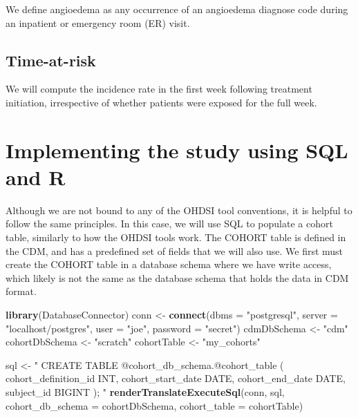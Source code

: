 \documentclass[11pt]{book}
\newenvironment{Shaded}{\begin{snugshade}}{\end{snugshade}}
\newcommand{\DataTypeTok}[1]{\textcolor[rgb]{0.13,0.29,0.53}{#1}}
\newcommand{\KeywordTok}[1]{\textcolor[rgb]{0.13,0.29,0.53}{\textbf{#1}}}
\newcommand{\NormalTok}[1]{#1}
\newcommand{\StringTok}[1]{\textcolor[rgb]{0.31,0.60,0.02}{#1}}
\theoremstyle{definition}
\theoremstyle{definition}
\theoremstyle{definition}
\theoremstyle{remark}
\begin{document}
We define angioedema as any occurrence of an angioedema diagnose code during an inpatient or emergency room (ER) visit.

\hypertarget{time-at-risk}{%
\subsection{Time-at-risk}\label{time-at-risk}}

We will compute the incidence rate in the first week following treatment initiation, irrespective of whether patients were exposed for the full week.

\hypertarget{implementing-the-study-using-sql-and-r}{%
\section{Implementing the study using SQL and R}\label{implementing-the-study-using-sql-and-r}}

Although we are not bound to any of the OHDSI tool conventions, it is helpful to follow the same principles. In this case, we will use SQL to populate a cohort table, similarly to how the OHDSI tools work. The COHORT table is defined in the CDM, and has a predefined set of fields that we will also use. We first must create the COHORT table in a database schema where we have write access, which likely is not the same as the database schema that holds the data in CDM format.

\begin{Shaded}
\begin{Highlighting}[]
\KeywordTok{library}\NormalTok{(DatabaseConnector)}
\NormalTok{conn <-}\StringTok{ }\KeywordTok{connect}\NormalTok{(}\DataTypeTok{dbms =} \StringTok{"postgresql"}\NormalTok{,}
                \DataTypeTok{server =} \StringTok{"localhost/postgres"}\NormalTok{,}
                \DataTypeTok{user =} \StringTok{"joe"}\NormalTok{,}
                \DataTypeTok{password =} \StringTok{"secret"}\NormalTok{)}
\NormalTok{cdmDbSchema <-}\StringTok{ "cdm"}
\NormalTok{cohortDbSchema <-}\StringTok{ "scratch"}
\NormalTok{cohortTable <-}\StringTok{ "my_cohorts"}

\NormalTok{sql <-}\StringTok{ "}
\StringTok{CREATE TABLE @cohort_db_schema.@cohort_table (}
\StringTok{  cohort_definition_id INT,}
\StringTok{  cohort_start_date DATE,}
\StringTok{  cohort_end_date DATE,}
\StringTok{  subject_id BIGINT}
\StringTok{);}
\StringTok{"}
\KeywordTok{renderTranslateExecuteSql}\NormalTok{(conn, sql,}
                          \DataTypeTok{cohort_db_schema =}\NormalTok{ cohortDbSchema,}
                          \DataTypeTok{cohort_table =}\NormalTok{ cohortTable)}
\end{Highlighting}
\end{Shaded}
\end{document}

